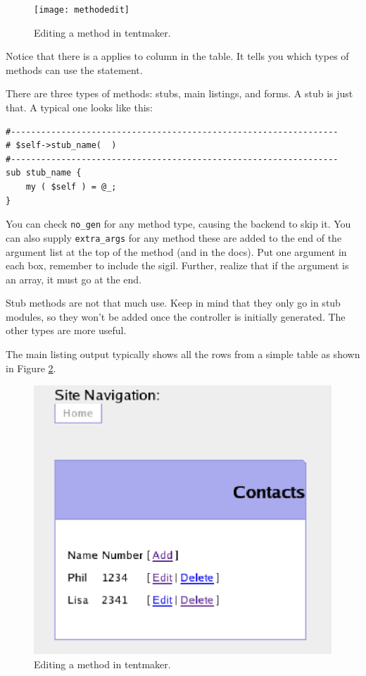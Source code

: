 \begin{figure}
\texttt{[image: methodedit]}
\caption{Editing a method in tentmaker.}
\label{fig:methodedit}
\end{figure}

Notice that there is a applies to column in the table.  It tells you which
types of methods can use the statement.

There are three types of methods: stubs, main listings, and forms.  A
stub is just that.  A typical one looks like this:

\begin{verbatim}
#-----------------------------------------------------------------
# $self->stub_name(  )
#-----------------------------------------------------------------
sub stub_name {
    my ( $self ) = @_;
}
\end{verbatim}

You can check \verb+no_gen+ for any method type, causing the backend
to skip it.  You can also supply \verb+extra_args+ for any method these
are added to the end of the argument list at the top of the method
(and in the docs).  Put one argument in each box, remember to include
the sigil.  Further, realize that if the argument is an array, it must
go at the end.

Stub methods are not that much use.  Keep in mind that they only go in
stub modules, so they won't be added once the controller is initially
generated.  The other types are more useful.

The main listing output typically shows all the rows from a simple table
as shown in Figure \ref{fig:main_listingout}.

\begin{figure}
\includegraphics[width=6in]{main_listingout}
\caption{Editing a method in tentmaker.}
\label{fig:main_listingout}
\end{figure}

